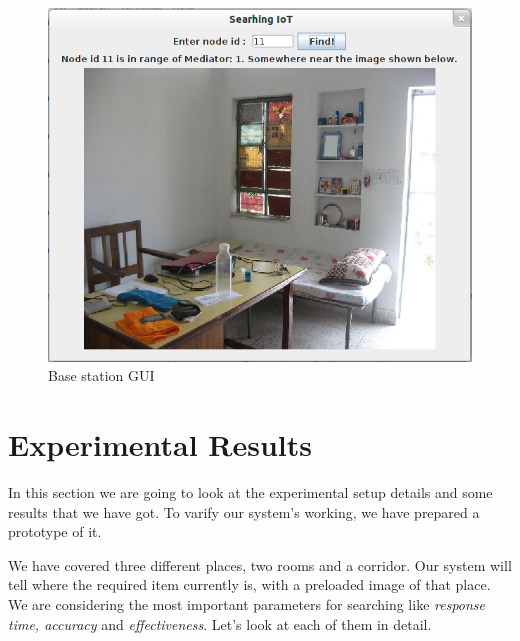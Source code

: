 \documentclass [a4paper,12pt]{book}
\begin{document}
\vspace{0.5cm}
\begin{figure}[!h]
\begin{center}
\includegraphics[scale=0.55]{images/16.png}
\caption{Base station GUI}
\label{ex}
\end{center}
\end{figure}

\section{Experimental Results}
In this section we are going to look at the experimental setup details and some results that we have got. To varify our system's working, we have prepared a prototype of it.

We have covered three different places, two rooms and a corridor. Our system will tell where the required item currently is, with a preloaded image of that place. We are considering the most important parameters for searching like \emph{response time, accuracy} and \emph{effectiveness}. Let's look at each of them in detail.
\end{document}
